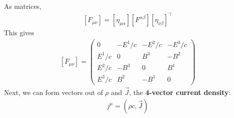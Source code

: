 \documentclass{article}
\theoremstyle{definition}
\begin{document}
As matrices,
\begin{align*}
\boxed{[F_{\mu\nu}] = [\eta_{\mu\alpha}][F^{\alpha\beta}][\eta_{\nu\beta}]^{\top}}
\end{align*}
This gives
\begin{align*}
\boxed{[F_{\mu\nu}] = 
	\begin{pmatrix}
	0 & -E^1/c & -E^2/c & -E^3/c\\
	E^1/c & 0 & B^3 & -B^2\\
	E^2/c & -B^3 & 0 & B^1\\
	E^3/c & B^2 & -B^1 & 0
	\end{pmatrix}}
\end{align*}
Next, we can form vectors out of $\rho$ and $\vec{J}$, the \textbf{4-vector current density}:
\begin{align*}
\boxed{j^\mu = \left( \rho c, \vec{J} \right)}
\end{align*}
\end{document}

